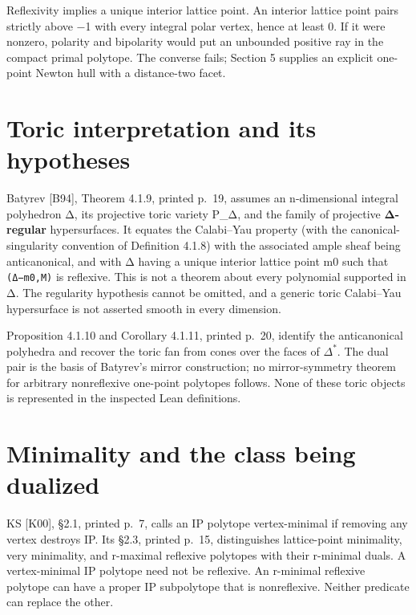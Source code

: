 \documentclass[11pt,a4paper,oneside]{report}
\begin{document}
Reflexivity implies a unique interior lattice point. An interior lattice
point pairs strictly above −1 with every integral polar vertex, hence at
least 0. If it were nonzero, polarity and bipolarity would put an
unbounded positive ray in the compact primal polytope. The converse
fails; Section 5 supplies an explicit one-point Newton hull with a
distance-two facet.

\section{Toric interpretation and its
hypotheses}\label{ip-reflexivity-and-pyramids--toric-interpretation-and-its-hypotheses}

Batyrev {[}B94{]}, Theorem 4.1.9, printed p.~19, assumes an
n-dimensional integral polyhedron Δ, its projective toric variety P\_Δ,
and the family of projective \textbf{Δ-regular} hypersurfaces. It
equates the Calabi--Yau property (with the canonical-singularity
convention of Definition 4.1.8) with the associated ample sheaf being
anticanonical, and with Δ having a unique interior lattice point m0 such
that \texttt{(\allowbreak{}Δ−m0,\allowbreak{}M)} is reflexive. This is
not a theorem about every polynomial supported in Δ. The regularity
hypothesis cannot be omitted, and a generic toric Calabi--Yau
hypersurface is not asserted smooth in every dimension.

Proposition 4.1.10 and Corollary 4.1.11, printed p.~20, identify the
anticanonical polyhedra and recover the toric fan from cones over the
faces of \(\Delta^{*}\). The dual pair is the basis of Batyrev's mirror
construction; no mirror-symmetry theorem for arbitrary nonreflexive
one-point polytopes follows. None of these toric objects is represented
in the inspected Lean definitions.

\section{Minimality and the class being
dualized}\label{ip-reflexivity-and-pyramids--minimality-and-the-class-being-dualized}

KS {[}K00{]}, §2.1, printed p.~7, calls an IP polytope vertex-minimal if
removing any vertex destroys IP. Its §2.3, printed p.~15, distinguishes
lattice-point minimality, very minimality, and r-maximal reflexive
polytopes with their r-minimal duals. A vertex-minimal IP polytope need
not be reflexive. An r-minimal reflexive polytope can have a proper IP
subpolytope that is nonreflexive. Neither predicate can replace the
other.
\end{document}
